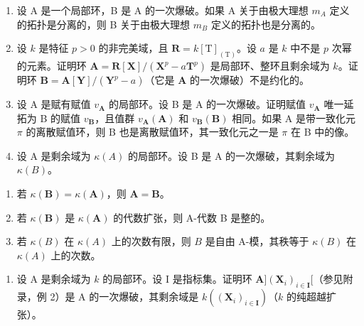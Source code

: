 \begin{enumerate}
\def\labelenumi{\arabic{enumi})}
\setcounter{enumi}{1}
\item
  设 A 是一个局部环，B 是 A 的一次爆破。如果 A 关于由极大理想 \(m_{A}\) 定义的拓扑是分离的，则 B 关于由极大理想 \(m_{B}\) 定义的拓扑也是分离的。
\item
  设 \(k\) 是特征 \(p > 0\) 的非完美域，且 \(\mathbf{R} = k[\mathrm{T}]_{(\mathrm{T})}\)。设 \(a\) 是 \(k\) 中不是 \(p\) 次幂的元素。证明环 \(\mathbf{A} = \mathbf{R}[\mathbf{X}] / (\mathbf{X}^p - a\mathbf{T}^p)\) 是局部环、整环且剩余域为 \(k\)。证明环 \(\mathbf{B} = \mathbf{A}[\mathbf{Y}] / (\mathbf{Y}^p - a)\)（它是 \(\mathbf{A}\) 的一次爆破）不是约化的。
\item
  设 A 是赋有赋值 \(v_{\mathbf{A}}\) 的局部环。设 B 是 A 的一次爆破。证明赋值 \(v_{\mathbf{A}}\) 唯一延拓为 B 的赋值 \(v_{\mathbf{B}}\)，且值群 \(v_{\mathbf{A}}(\mathbf{A})\) 和 \(v_{\mathbf{B}}(\mathbf{B})\) 相同。如果 A 是带一致化元 \(\pi\) 的离散赋值环，则 B 也是离散赋值环，其一致化元之一是 \(\pi\) 在 B 中的像。
\item
  设 A 是剩余域为 \(\kappa(A)\) 的局部环。设 B 是 A 的一次爆破，其剩余域为 \(\kappa(B)\)。
\end{enumerate}

\begin{enumerate}
\def\labelenumi{\alph{enumi})}
\item
  若 \(\kappa(\mathbf{B}) = \kappa(\mathbf{A})\)，则 \(\mathbf{A} = \mathbf{B}\)。
\item
  若 \(\kappa(\mathbf{B})\) 是 \(\kappa(\mathbf{A})\) 的代数扩张，则 A-代数 B 是整的。
\item
  若 \(\kappa(B)\) 在 \(\kappa(A)\) 上的次数有限，则 \(B\) 是自由 A-模，其秩等于 \(\kappa(B)\) 在 \(\kappa(A)\) 上的次数。
\end{enumerate}

\begin{enumerate}
\def\labelenumi{\arabic{enumi})}
\setcounter{enumi}{5}
\tightlist
\item
  设 A 是剩余域为 \(k\) 的局部环。设 I 是指标集。证明环 \(\mathbf{A}](\mathbf{X}_i)_{i\in \mathbf{I}}[\)（参见附录，例 2）是 A 的一次爆破，其剩余域是 \(k((\mathbf{X}_i)_{i\in \mathbf{I}})\)（\(k\) 的纯超越扩张）。
\end{enumerate}

